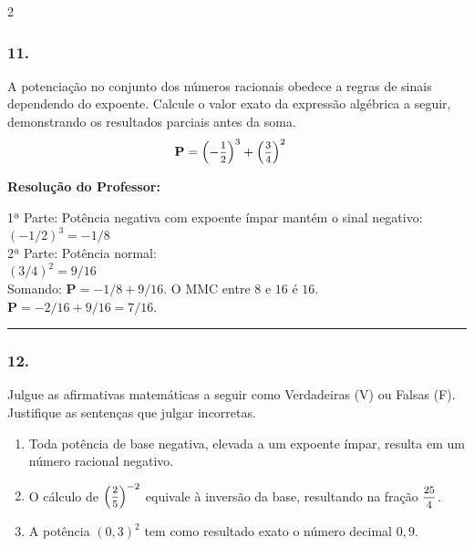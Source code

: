 \begin{multicols*}{2}
\subsubsection*{11.} A potenciação no conjunto dos números racionais obedece a regras de sinais dependendo do expoente. Calcule o valor exato da expressão algébrica a seguir, demonstrando os resultados parciais antes da soma.
$$
\begin{aligned}
& \textbf{P} = \left( -\mfrac{1}{2} \right)^{3} + \left( \mfrac{3}{4} \right)^{2}
\end{aligned}
$$

\ifgabarito
    \begin{tcolorbox}[colback=CorTitUm!5, colframe=CorTitUm, boxrule=1pt, arc=4pt, left=6pt, right=6pt, top=6pt, bottom=6pt]
    \small\textbf{\textcolor{CorTitUm}{Resolução do Professor:}}\par\vspace{0.1cm}
    \color{CinzaEscuro}
    1ª Parte: Potência negativa com expoente ímpar mantém o sinal negativo:\\
    $ (-1/2)^{3} = -1/8 $\\
    2ª Parte: Potência normal:\\
    $ (3/4)^{2} = 9/16 $\\
    Somando: $ \textbf{P} = -1/8 + 9/16 $. O MMC entre $8$ e $16$ é $16$.\\
    $ \textbf{P} = -2/16 + 9/16 = 7/16 $.
    \end{tcolorbox}
\fi

\par\vspace{\espacoQuestao}

\noindent\textcolor{CorLinha}{\rule{\linewidth}{0.5pt}} 
\par\vspace{\espacoPreQuestao}
\subsubsection*{12.} Julgue as afirmativas matemáticas a seguir como Verdadeiras (V) ou Falsas (F). Justifique as sentenças que julgar incorretas.
\begin{enumerate}[label=\Roman*., itemsep=\espacoAlt]
    \item Toda potência de base negativa, elevada a um expoente ímpar, resulta em um número racional negativo.
    \item O cálculo de $ \left( \mfrac{2}{5} \right)^{-2} $ equivale à inversão da base, resultando na fração $ \mfrac{25}{4} $.
    \item A potência $ \left( 0,3 \right)^{2} $ tem como resultado exato o número decimal $ 0,9 $.
\end{enumerate}


\end{multicols*}

